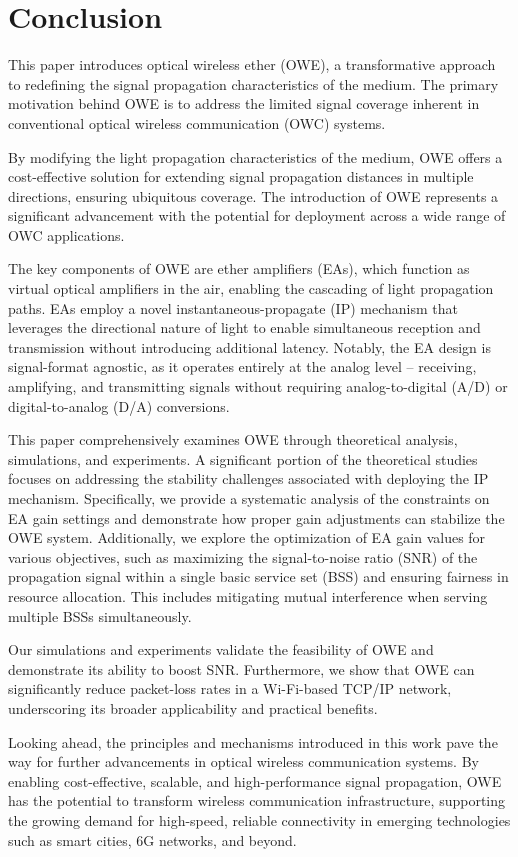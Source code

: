 \section{Conclusion}
This paper introduces optical wireless ether (OWE), a transformative approach to redefining the signal propagation characteristics of the medium. The primary motivation behind OWE is to address the limited signal coverage inherent in conventional optical wireless communication (OWC) systems.
\par
By modifying the light propagation characteristics of the medium, OWE offers a cost-effective solution for extending signal propagation distances in multiple directions, ensuring ubiquitous coverage. The introduction of OWE represents a significant advancement with the potential for deployment across a wide range of OWC applications.
\par
The key components of OWE are ether amplifiers (EAs), which function as virtual optical amplifiers in the air, enabling the cascading of light propagation paths. EAs employ a novel instantaneous-propagate (IP) mechanism that leverages the directional nature of light to enable simultaneous reception and transmission without introducing additional latency. Notably, the EA design is signal-format agnostic, as it operates entirely at the analog level -- receiving, amplifying, and transmitting signals without requiring analog-to-digital (A/D) or digital-to-analog (D/A) conversions.
\par
This paper comprehensively examines OWE through theoretical analysis, simulations, and experiments. A significant portion of the theoretical studies focuses on addressing the stability challenges associated with deploying the IP mechanism. Specifically, we provide a systematic analysis of the constraints on EA gain settings and demonstrate how proper gain adjustments can stabilize the OWE system. Additionally, we explore the optimization of EA gain values for various objectives, such as maximizing the signal-to-noise ratio (SNR) of the propagation signal within a single basic service set (BSS) and ensuring fairness in resource allocation. This includes mitigating mutual interference when serving multiple BSSs simultaneously.
\par
Our simulations and experiments validate the feasibility of OWE and demonstrate its ability to boost SNR. Furthermore, we show that OWE can significantly reduce packet-loss rates in a Wi-Fi-based TCP/IP network, underscoring its broader applicability and practical benefits.
\par
Looking ahead, the principles and mechanisms introduced in this work pave the way for further advancements in optical wireless communication systems. By enabling cost-effective, scalable, and high-performance signal propagation, OWE has the potential to transform wireless communication infrastructure, supporting the growing demand for high-speed, reliable connectivity in emerging technologies such as smart cities, 6G networks, and beyond.